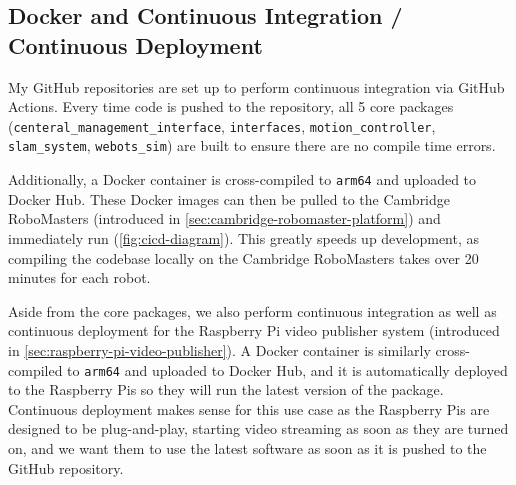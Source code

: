



\subsection{Docker and Continuous Integration / Continuous Deployment}
\label{sec:cicd}
My GitHub repositories are set up to perform continuous integration via GitHub Actions. Every time code is pushed to the repository, all 5 core packages (\texttt{centeral\_management\_interface}, \texttt{interfaces}, \texttt{motion\_controller}, \texttt{slam\_system}, \texttt{webots\_sim}) are built to ensure there are no compile time errors.

Additionally, a Docker container is cross-compiled to \texttt{arm64} and uploaded to Docker Hub. These Docker images can then be pulled to the Cambridge RoboMasters (introduced in \autoref{sec:cambridge-robomaster-platform}) and immediately run (\autoref{fig:cicd-diagram}). This greatly speeds up development, as compiling the codebase locally on the Cambridge RoboMasters takes over 20 minutes for each robot.

Aside from the core packages, we also perform continuous integration as well as continuous deployment for the Raspberry Pi video publisher system (introduced in \autoref{sec:raspberry-pi-video-publisher}). A Docker container is similarly cross-compiled to \texttt{arm64} and uploaded to Docker Hub, and it is automatically deployed to the Raspberry Pis so they will run the latest version of the package. Continuous deployment makes sense for this use case as the Raspberry Pis are designed to be plug-and-play, starting video streaming as soon as they are turned on, and we want them to use the latest software as soon as it is pushed to the GitHub repository.

